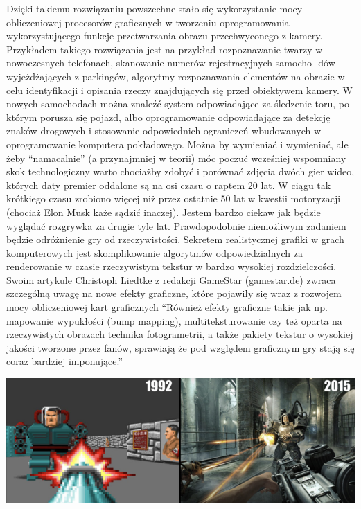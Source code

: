 \documentclass{article}
\begin{document}
Dzięki takiemu rozwiązaniu powszechne stało się wykorzystanie mocy obliczeniowej procesorów graficznych w tworzeniu oprogramowania wykorzystującego funkcje przetwarzania obrazu przechwyconego z kamery. Przykładem takiego rozwiązania jest na przykład rozpoznawanie twarzy w nowoczesnych telefonach, skanowanie numerów rejestracyjnych samocho- dów wyjeżdżających z parkingów, algorytmy rozpoznawania elementów na obrazie w celu identyfikacji i opisania rzeczy znajdujących się przed obiektywem kamery. W nowych samochodach można znaleźć system odpowiadające za śledzenie toru, po którym porusza się pojazd, albo oprogramowanie odpowiadające za detekcję znaków drogowych i stosowanie odpowiednich ograniczeń wbudowanych w oprogramowanie komputera pokładowego. Można by wymieniać i wymieniać, ale żeby “namacalnie” (a przynajmniej w teorii) móc poczuć wcześniej wspomniany skok technologiczny warto chociażby zdobyć i porównać zdjęcia dwóch gier wideo, których daty premier oddalone są na osi czasu o raptem 20 lat. W ciągu tak krótkiego czasu zrobiono więcej niż przez ostatnie 50 lat w kwestii motoryzacji (chociaż Elon Musk każe sądzić inaczej). Jestem bardzo ciekaw jak będzie wyglądać rozgrywka za drugie tyle lat. Prawdopodobnie niemożliwym zadaniem będzie odróżnienie gry od rzeczywistości.
Sekretem realistycznej grafiki w grach komputerowych jest skomplikowanie algorytmów odpowiedzialnych za renderowanie w czasie rzeczywistym tekstur w bardzo wysokiej rozdzielczości. Swoim artykule Christoph Liedtke z redakcji GameStar (gamestar.de) \cite{ref7} zwraca szczególną uwagę na nowe efekty graficzne, które pojawiły się wraz z rozwojem mocy obliczeniowej kart graficznych “Również efekty graficzne takie jak np. mapowanie wypukłości (bump mapping), multiteksturowanie czy też oparta na rzeczywistych obrazach technika fotogrametrii, a także pakiety tekstur o wysokiej jakości tworzone przez fanów, sprawiają że pod względem graficznym gry stają się coraz bardziej imponujące.”\\
\begin{center}
\includegraphics{grafika}
\end{center}
\end{document}
